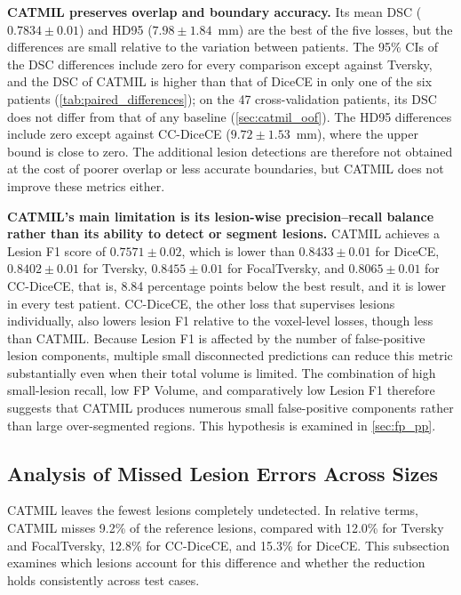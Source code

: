 \textbf{CATMIL preserves overlap and boundary accuracy.} Its mean DSC
($0.7834 \pm 0.01$) and HD95 ($7.98 \pm 1.84$~mm) are the best of the five
losses, but the differences are small relative to the variation between
patients. The 95\% CIs of the DSC differences include zero for every
comparison except against Tversky, and the DSC of CATMIL is higher than
that of DiceCE in only one of the six patients
(\cref{tab:paired_differences}); on the 47 cross-validation patients, its
DSC does not differ from that of any baseline (\cref{sec:catmil_oof}).
The HD95 differences include zero except against CC-DiceCE ($9.72 \pm
1.53$~mm), where the upper bound is close to zero. The additional lesion
detections are therefore not obtained at the cost of poorer overlap or less
accurate boundaries, but CATMIL does not improve these metrics either.

\textbf{CATMIL's main limitation is its lesion-wise precision--recall
balance rather than its ability to detect or segment lesions.} CATMIL
achieves a Lesion F1 score of $0.7571 \pm 0.02$, which is lower than
$0.8433 \pm 0.01$ for DiceCE, $0.8402 \pm 0.01$ for Tversky,
$0.8455 \pm 0.01$ for FocalTversky, and $0.8065 \pm 0.01$ for CC-DiceCE,
that is, 8.84 percentage points below the best result, and it is lower in
every test patient. CC-DiceCE, the other loss that supervises lesions
individually, also lowers lesion F1 relative to the voxel-level losses,
though less than CATMIL. Because Lesion F1
is affected by the number of
false-positive lesion components, multiple small disconnected predictions
can reduce this metric substantially even when their total volume is
limited. The combination of high small-lesion recall, low FP Volume, and
comparatively low Lesion F1 therefore suggests that CATMIL produces
numerous small false-positive components rather than large over-segmented
regions. This hypothesis is examined in \cref{sec:fp_pp}.

\subsection{Analysis of Missed Lesion Errors Across Sizes}

CATMIL leaves the fewest lesions completely undetected. In relative terms,
CATMIL misses 9.2\% of the reference lesions, compared with 12.0\% for
Tversky and FocalTversky, 12.8\% for CC-DiceCE, and 15.3\% for DiceCE.
This subsection examines which lesions account for this difference and
whether the reduction holds consistently across test cases.


